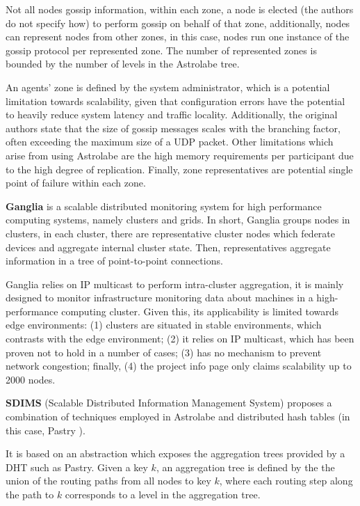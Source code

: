 Not all nodes gossip information, within each zone, a node is elected (the authors do not specify how) to perform gossip on behalf of that zone, additionally, nodes can represent nodes from other zones, in this case, nodes run one instance of the gossip protocol per represented zone. The number of represented zones is bounded by the number of levels in the Astrolabe tree.

An agents' zone is defined by the system administrator, which is a potential limitation towards scalability, given that configuration errors have the potential to heavily reduce system latency and traffic locality. Additionally, the original authors state that the size of gossip messages scales with the branching factor, often exceeding the maximum size of a UDP packet. Other limitations which arise from using Astrolabe are the high memory requirements per participant due to the high degree of replication. Finally, zone representatives are potential single point of failure within each zone. 

\textbf{Ganglia} \cite{massie2004ganglia} is a scalable distributed monitoring system for high performance computing systems, namely clusters and grids. In short, Ganglia groups nodes in clusters, in each cluster, there are representative cluster nodes which federate devices and aggregate internal cluster state. Then, representatives aggregate information in a tree of point-to-point connections.

Ganglia relies on IP multicast to perform intra-cluster aggregation, it is mainly designed to monitor infrastructure monitoring data about machines in a high-performance computing cluster. Given this, its applicability is limited towards edge environments: (1) clusters are situated in stable environments, which contrasts with the edge environment; (2) it relies on IP multicast, which has been proven not to hold in a number of cases; (3) has no mechanism to prevent network congestion; finally, (4) the project info page only claims scalability up to 2000 nodes.

\textbf{SDIMS} \cite{SDIMS} (Scalable Distributed Information Management System) proposes a combination of techniques employed in Astrolabe \cite{Renesse2003} and distributed hash tables (in this case, Pastry \cite{rowstron2001pastry}).

It is based on an abstraction which exposes the aggregation trees provided by a DHT such as Pastry. Given a key $k$, an aggregation tree is defined by the the union of the routing paths from all nodes to key $k$, where each routing step along the path to $k$ corresponds to a level in the aggregation tree.

